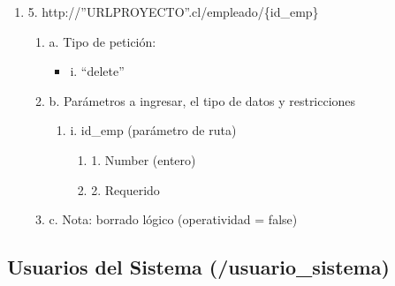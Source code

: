 \begin{enumerate}
    \item 5. http://”URLPROYECTO”.cl/empleado/\{id\_emp\}
    \begin{enumerate}
        \item a. Tipo de petición:
            \begin{itemize}
               \item i. “delete”
            \end{itemize}
        \item b. Parámetros a ingresar, el tipo de datos y restricciones
            \begin{enumerate}
                \item i. id\_emp (parámetro de ruta)
                    \begin{enumerate}
                        \item 1. Number (entero)
                        \item 2. Requerido
                    \end{enumerate}
            \end{enumerate}
        \item c. Nota: borrado lógico (operatividad = false)
    \end{enumerate}
\end{enumerate}

\subsection{Usuarios del Sistema (/usuario\_sistema)}


